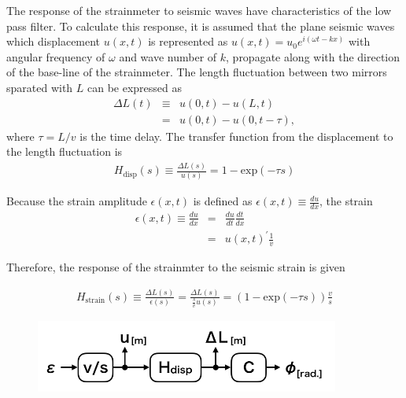The response of the strainmeter to seismic waves have characteristics of the low pass filter. To calculate this response, it is assumed that the plane seismic waves which displacement $u(x,t)$ is represented as $u(x,t)=u_0e^{i(\omega{t}-kx)}$ with angular frequency of $\omega$ and wave number of $k$, propagate along with the direction of the base-line of the strainmeter. The length fluctuation between two mirrors sparated with $L$ can be expressed as 
\begin{eqnarray}
  \Delta{L(t)} &\equiv& u(0,t) - u(L,t) \\
  &=& u(0,t) - u(0,t-\tau), \label{eq:chap4_10}
\end{eqnarray}
where $\tau=L/v$ is the time delay. 
The transfer function from the displacement to the length fluctuation is
\begin{eqnarray}
  H_{\mathrm{disp}}(s) \equiv \frac{\Delta{L(s)}}{u(s)} = 1 - \mathrm{exp}(-\tau{s})
\end{eqnarray}

Because the strain amplitude $\epsilon(x,t)$ is defined as $\epsilon(x,t)\equiv\frac{du}{dx}$, the strain
\begin{eqnarray}
  \epsilon(x,t) \equiv \frac{du}{dx} &=& \frac{du}{dt} \frac{dt}{dx}\\
  &=& {u(x,t)}^{\prime}\frac{1}{v}
\end{eqnarray}


Therefore, the response of the strainmter to the seismic strain is given

\begin{eqnarray}
  H_{\mathrm{strain}}(s) \equiv \frac{\Delta{L(s)}}{\epsilon(s)} = \frac{\Delta{L(s)}}{\frac{s}{v}u(s)} = \left(1 - \mathrm{exp}(-\tau{s})\right) \frac{v}{s}
\end{eqnarray}



\begin{figure}[h]
  \begin{center}
    \includegraphics[width=10.0cm]{./img_chap4/img411.png}
    \caption{}
  \end{center}
\end{figure}


